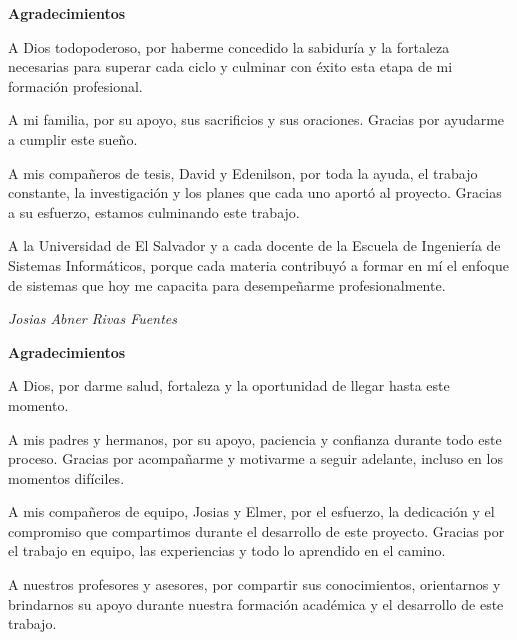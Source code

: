 \documentclass[12pt,letterpaper]{report}
\begin{document}
\newpage
{}
\setcounter{page}{1}

\onehalfspacing
\begin{center}
{\large\bfseries Agradecimientos\par}
\end{center}
\vspace{0.5cm}

\noindent A Dios todopoderoso, por haberme concedido la sabidur\'ia y la fortaleza necesarias para superar cada ciclo y culminar con \'exito esta etapa de mi formaci\'on profesional.

\noindent A mi familia, por su apoyo, sus sacrificios y sus oraciones. Gracias por ayudarme a cumplir este sue\~no.

\noindent A mis compa\~neros de tesis, David y Edenilson, por toda la ayuda, el trabajo constante, la investigaci\'on y los planes que cada uno aport\'o al proyecto. Gracias a su esfuerzo, estamos culminando este trabajo.

\noindent A la Universidad de El Salvador y a cada docente de la Escuela de Ingenier\'ia de Sistemas Inform\'aticos, porque cada materia contribuy\'o a formar en m\'i el enfoque de sistemas que hoy me capacita para desempe\~narme profesionalmente.

\begin{flushright}
\textit{Josias Abner Rivas Fuentes}
\end{flushright}

\newpage
\begin{center}
{\large\bfseries Agradecimientos\par}
\end{center}
\vspace{0.5cm}

\noindent A Dios, por darme salud, fortaleza y la oportunidad de llegar hasta este momento.

\noindent A mis padres y hermanos, por su apoyo, paciencia y confianza durante todo este proceso. Gracias por acompa\~narme y motivarme a seguir adelante, incluso en los momentos dif\'iciles.

\noindent A mis compa\~neros de equipo, Josias y Elmer, por el esfuerzo, la dedicaci\'on y el compromiso que compartimos durante el desarrollo de este proyecto. Gracias por el trabajo en equipo, las experiencias y todo lo aprendido en el camino.

\noindent A nuestros profesores y asesores, por compartir sus conocimientos, orientarnos y brindarnos su apoyo durante nuestra formaci\'on acad\'emica y el desarrollo de este trabajo.
\end{document}
